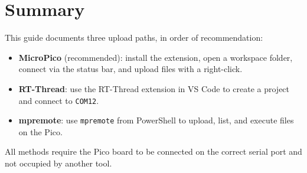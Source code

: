 \documentclass[11pt,a4paper]{article}
\begin{document}
\section{Summary}
This guide documents three upload paths, in order of recommendation:
\begin{itemize}
  \item \textbf{MicroPico} (recommended): install the extension, open a workspace folder, connect via the status bar, and upload files with a right-click.
  \item \textbf{RT-Thread}: use the RT-Thread extension in VS Code to create a project and connect to \texttt{COM12}.
  \item \textbf{mpremote}: use \texttt{mpremote} from PowerShell to upload, list, and execute files on the Pico.
\end{itemize}
All methods require the Pico board to be connected on the correct serial port and not occupied by another tool.
\end{document}

